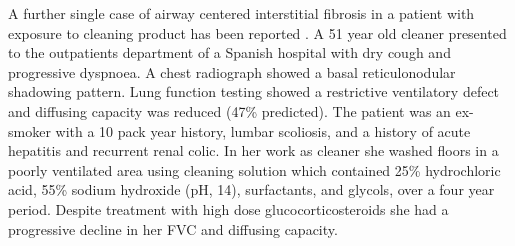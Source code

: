 \documentclass[a4paper,12pt]{article}
\begin{document}
A further single case of airway centered interstitial fibrosis in a patient with exposure to cleaning product has been reported \cite{Serrano2006}. A 51 year old cleaner presented to the outpatients department of a Spanish hospital with dry cough and progressive dyspnoea. A chest radiograph showed a basal reticulonodular shadowing pattern. Lung function testing showed a restrictive ventilatory defect and diffusing capacity was reduced (47\% predicted). The patient was an ex-smoker with a 10 pack year history, lumbar scoliosis, and a history of acute hepatitis and recurrent renal colic. In her work as cleaner she washed floors in a poorly ventilated area using cleaning solution which contained 25\% hydrochloric acid, 55\% sodium hydroxide (pH, 14), surfactants, and glycols, over a four year period. Despite treatment with high dose glucocorticosteroids she had a progressive decline in her FVC and diffusing capacity.
\end{document}
